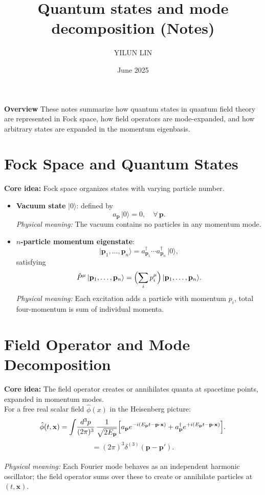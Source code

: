 \documentclass[11pt]{article}
\title{Quantum states and mode decomposition (Notes)}
\author{YILUN LIN}
\date{June 2025}
\numberwithin{equation}{section}
\begin{document}
\maketitle
\Large\textbf{Overview}
\newline
{\Large These notes summarize how quantum states in quantum field theory are represented in Fock space, how field operators are mode-expanded, and how arbitrary states are expanded in the momentum eigenbasis.}

\section{Fock Space and Quantum States}
\textbf{Core idea:} Fock space organizes states with varying particle number. \\
\begin{itemize}
 \item\textbf{Vacuum state}  $\lvert0\rangle$: defined by
 \begin{equation}
 a_{\mathbf p}\, \lvert0\rangle = 0,\quad \forall\, \mathbf p.
 \end{equation}
 \textit{Physical meaning:} The vacuum contains no particles in any momentum mode.
 \item \textbf{$n$-particle momentum eigenstate}:
 \begin{equation}
 \lvert \mathbf p_1, \dots,\mathbf p_n\rangle = a_{\mathbf p_1}^\dagger\cdots 
 a_{\mathbf p_n}^\dagger\,\lvert0\rangle,
 \end{equation}
 satisfying
 \begin{equation}
 \hat P^\mu\, \lvert \mathbf p_1, \dots,\mathbf p_n\rangle = \Bigl(\sum_i p_i^\mu\Bigr)\,\lvert \mathbf p_1,\dots,\mathbf p_n\rangle.
 \end{equation}
 \textit{Physical meaning:} Each excitation adds a particle with momentum $p_i$,
 total four-momentum is sum of individual momenta.
\\[1em]
\end{itemize}

\section{Field Operator and Mode Decomposition}
\textbf{Core idea:} The field operator creates or annihilates quanta at spacetime points, expanded in momentum modes. \\[1em]
For a free real scalar field $\hat\phi(x)$ in the Heisenberg picture:
\begin{equation}
   \hat\phi(t,\mathbf x) = \int\!\frac{d^3p}{(2\pi)^3}\, \frac{1}{\sqrt{2E_{\mathbf p}}}\Bigl[a_{\mathbf p} e^{-i(E_{\mathbf p}t-\mathbf p\cdot\mathbf x)} + a_{\mathbf p}^\dagger e^{+i(E_{\mathbf p}t-\mathbf p \cdot \mathbf x)}\Bigr]. 
\end{equation}   
\begin{equation}
   [a_{\mathbf p}, \, a_{\mathbf p'}^\dagger] = (2\pi)^3 \delta^{(3)} (\mathbf p-\mathbf p').
\end{equation}
\\[1em]
\textit{Physical meaning:} Each Fourier mode behaves as an independent harmonic oscillator; the field operator sums over these to create or annihilate particles at $(t,\mathbf x)$.
\\[1em]
\end{document}
